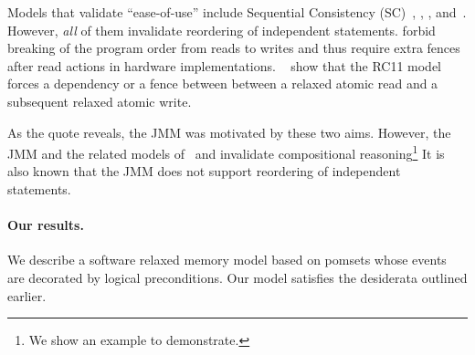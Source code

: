 Models that validate ``ease-of-use'' include Sequential Consistency (SC)~\citet{Lamport:1979:MMC:1311099.1311750}, \citet{Dolan:2018:BDR:3192366.3192421}, \citet{DBLP:conf/pldi/LahavVKHD17}, \citet{DBLP:conf/lics/JeffreyR16} and~\citet{BoehmOOTA}.  However, {\em all} of them invalidate reordering of independent statements.  \cite{Dolan:2018:BDR:3192366.3192421,BoehmOOTA,DBLP:conf/lics/JeffreyR16} forbid breaking of the program order from reads to writes and thus require extra fences after read actions in hardware implementations.  ~\citet{Boehm:2014:OGA:2618128.2618134} show that the RC11 model\cite{DBLP:conf/pldi/LahavVKHD17} forces a dependency or a fence between between a relaxed atomic
read and a subsequent relaxed atomic write.  


As the quote reveals, the JMM\citet{Manson:2005:JMM:1047659.1040336} was motivated by these two aims.  However, the JMM and the related models of~\citet{DBLP:conf/esop/JagadeesanPR10} and \citet{DBLP:conf/popl/KangHLVD17} invalidate compositional reasoning\footnote{We show an example to demonstrate.} It is also known that the JMM does not support reordering of independent statements.  

\paragraph{Our results. } We describe a software relaxed memory model based on pomsets whose events are decorated by logical  preconditions.   Our model satisfies the desiderata outlined earlier.

